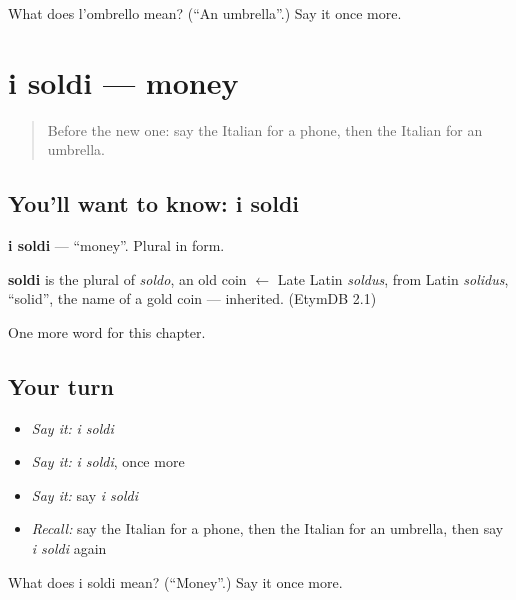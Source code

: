 \begin{tcolorbox}[breakable,colback=teal!4,colframe=teal!35!black,title={Before you move on}]
What does l'ombrello mean? (\textquotedblleft{}An umbrella\textquotedblright{}.) Say it once more.
\end{tcolorbox}
\section[i soldi]{i soldi — money}

\label{lesson:IT-C62-soldi}



\begin{quote}
Before the new one: say the Italian for a phone, then the Italian for an umbrella.
\end{quote}

\subsection*{You'll want to know: i soldi}
\textbf{i soldi} — \textquotedblleft{}money\textquotedblright{}. Plural in form.

\begin{cousinweb}
\textbf{soldi} is the plural of \emph{soldo}, an old coin $\leftarrow$ Late Latin \emph{soldus}, from Latin \emph{solidus}, \textquotedblleft{}solid\textquotedblright{}, the name of a gold coin — inherited. (EtymDB 2.1)
\end{cousinweb}

\begin{grammarlens}[title={What you've built}]
One more word for this chapter.
\end{grammarlens}

\subsection*{Your turn}
\begin{itemize}
\raggedright
  \item \emph{Say it:} \emph{i soldi}
  \item \emph{Say it:} \emph{i soldi}, once more
  \item \emph{Say it:} say \emph{i soldi}
  \item \emph{Recall:} say the Italian for a phone, then the Italian for an umbrella, then say \emph{i soldi} again
\end{itemize}

\begin{tcolorbox}[breakable,colback=teal!4,colframe=teal!35!black,title={Before you move on}]
What does i soldi mean? (\textquotedblleft{}Money\textquotedblright{}.) Say it once more.
\end{tcolorbox}
